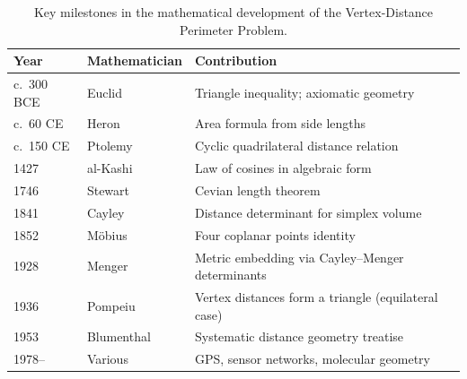 \begin{table}[h!]
\centering
\caption{Key milestones in the mathematical development of the Vertex-Distance Perimeter Problem.}
\label{tab:timeline}
\begin{tabular}{lll}
\toprule
\textbf{Year} & \textbf{Mathematician} & \textbf{Contribution} \\
\midrule
c.~300 BCE & Euclid & Triangle inequality; axiomatic geometry \\
c.~60 CE & Heron & Area formula from side lengths \\
c.~150 CE & Ptolemy & Cyclic quadrilateral distance relation \\
1427 & al-Kashi & Law of cosines in algebraic form \\
1746 & Stewart & Cevian length theorem \\
1841 & Cayley & Distance determinant for simplex volume \\
1852 & M\"obius & Four coplanar points identity \\
1928 & Menger & Metric embedding via Cayley--Menger determinants \\
1936 & Pompeiu & Vertex distances form a triangle (equilateral case) \\
1953 & Blumenthal & Systematic distance geometry treatise \\
1978-- & Various & GPS, sensor networks, molecular geometry \\
\bottomrule
\end{tabular}
\end{table}

